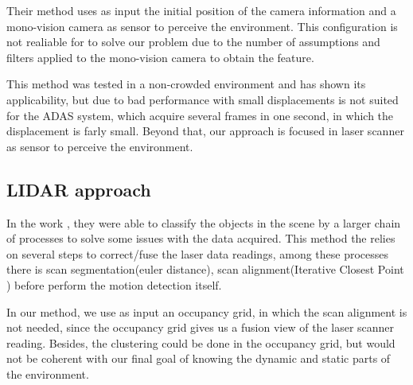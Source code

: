 Their method uses as input the initial position of the camera information and a mono-vision camera as sensor to perceive the environment. This configuration is not realiable for to solve our problem due to the number of assumptions and filters applied to the mono-vision camera to obtain the feature.

This method was tested in a non-crowded environment and has shown its applicability, but due to bad performance with small displacements is not suited for the ADAS system, which acquire several frames in one second, in which the displacement is farly small. Beyond that, our approach is focused in laser scanner as sensor to perceive the environment.

\subsection{LIDAR approach}

In the work \cite{4650636}, they were able to classify the objects in the scene by a larger chain of processes to solve some issues with the data acquired. This method the relies on several steps to correct/fuse the laser data readings, among these processes there is scan segmentation(euler distance), scan alignment(Iterative Closest Point \cite{10.1109/34.121791}) before perform the motion detection itself. 


In our method, we use as input an occupancy grid, in which the scan alignment is not needed, since the occupancy grid gives us a fusion view of the laser scanner reading. Besides, the clustering could be done in the occupancy grid, but would not be coherent with our final goal of knowing the dynamic and static parts of the environment.


